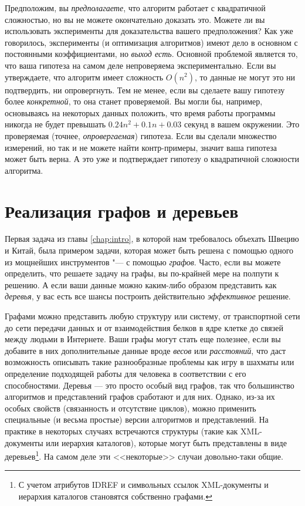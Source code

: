 Предположим, вы \textit{предполагаете}, что алгоритм работает с квадратичной сложностью, но вы не можете окончательно доказать это. Можете ли вы использовать эксперименты для доказательства вашего предположения? Как уже говорилось, эксперименты (и оптимизация алгоритмов) имеют дело в основном с постоянными коэффициентами, но \textit{выход есть}. Основной проблемой является то, что ваша гипотеза на самом деле непроверяема экспериментально. Если вы утверждаете, что алгоритм имеет сложность $O(n^2)$, то данные не могут это ни подтвердить, ни опровергнуть. Тем не менее, если вы сделаете вашу гипотезу более \textit{конкретной}, то она станет проверяемой. Вы могли бы, например, основываясь на некоторых данных положить, что время работы программы никогда не будет превышать $0.24n^2+0.1n+0.03$ секунд в вашем окружении. Это проверяемая (точнее, \textit{опровергаемая}) гипотеза. Если вы сделали множество измерений, но так и не можете найти контр-примеры, значит ваша гипотеза может быть верна. А это уже и подтверждает гипотезу о квадратичной сложности алгоритма.

\section{Реализация графов и деревьев }
\label{sec:implementing-graphs-and-trees}
Первая задача из главы \ref{chap:intro}, в которой нам требовалось объехать Швецию и Китай, была примером задачи, которая может быть решена с помощью одного из мощнейших инструментов "--- с помощью \textit{графов}. Часто, если вы можете определить, что решаете задачу на графы, вы по-крайней мере на полпути к решению. А если ваши данные можно каким-либо образом представить как \textit{деревья}, у вас есть все шансы построить действительно \textit{эффективное} решение.

Графами можно представить любую структуру или систему, от транспортной сети до сети передачи данных и от взаимодействия белков в ядре клетке до связей между людьми в Интернете.
Ваши графы могут стать еще полезнее, если вы добавите в них дополнительные данные вроде \textit{весов} или \textit{расстояний}, что даст возможность описывать такие разнообразные проблемы как игру в шахматы или определение подходящей работы для человека в соответствии с его способностями.
Деревья — это просто особый вид графов, так что большинство алгоритмов и представлений графов сработают и для них.
Однако, из-за их особых свойств (связанность и отсутствие циклов), можно применить специальные (и весьма простые) версии алгоритмов и представлений.
На практике в некоторых случаях встречаются структуры (такие как XML-документы или иерархия каталогов), которые могут быть представлены в виде деревьев\footnote{С учетом атрибутов IDREF и символьных ссылок XML-документы и иерархия каталогов становятся собственно графами.}. На самом деле эти <<некоторые>> случаи довольно-таки общие.

